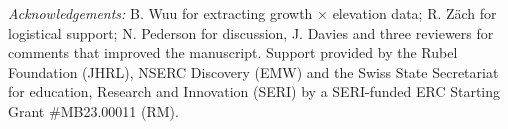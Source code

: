\documentclass[11pt]{article}
\begin{document}




\emph{Acknowledgements:} B. Wuu for extracting growth $\times$ elevation data; R. Z{\"a}ch for logistical support; N. Pederson for discussion, J. Davies and three reviewers for comments that improved the manuscript. Support provided by the Rubel Foundation (JHRL), NSERC Discovery (EMW) and the Swiss State Secretariat for education, Research and Innovation (SERI) by a SERI-funded ERC Starting Grant #MB23.00011 (RM). 
\end{document}
